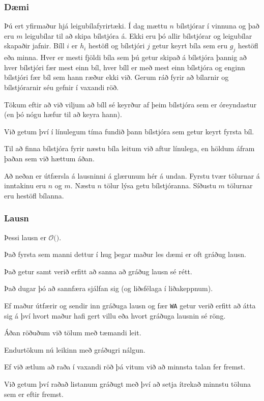 {
	\frametitle{Dæmi}
	{
		\item<1-> 
			Þú ert yfirmaður hjá leigubílafyrirtæki.
			Í dag mættu $n$ bílstjórar í vinnuna og það eru $m$ leigubílar til að skipa bílstjóra á.
			Ekki eru þó allir bílstjórar og leigubílar skapaðir jafnir.
			Bíll $i$ er $h_i$ hestöfl og bílstjóri $j$ getur keyrt bíla sem eru $g_j$ hestöfl eða minna.
			Hver er mesti fjöldi bíla sem þú getur skipað á bílstjóra
				þannig að hver bílstjóri fær mest einn bíl,
				hver bíll er með mest einn bílstjóra og
				enginn bílstjóri fær bíl sem hann ræður ekki við.
			Gerum ráð fyrir að bílarnir og bílstjórarnir séu gefnir í vaxandi röð.
		\item<2-> Tökum eftir að við viljum að bíll sé keyrður af þeim bílstjóra sem er óreyndastur (en þó nógu hæfur til að keyra hann).
		\item<3-> Við getum því í línulegum tíma fundið þann bílstjóra sem getur keyrt fyrsta bíl.
		\item<4-> Til að finna bílstjóra fyrir næstu bíla leitum við aftur línulega, en höldum áfram þaðan sem við hættum áðan.
	}
}

{
	Að neðan er útfærsla á lausninni á glærunum hér á undan. Fyrstu tvær tölurnar á inntakinu eru $n$ og $m$. 
		Næstu $n$ tölur lýsa getu bílstjóranna.
		Síðustu $m$ tölurnar eru hestöfl bílanna.
}

{
	\frametitle{Lausn}
	{
		\item<1-> Þessi lausn er $\mathcal{O}($\onslide<2->{$n + m$}$)$.
	}
}

{
	{
		\item<1-> Það fyrsta sem manni dettur í hug þegar maður les dæmi er oft gráðug lausn.
		\item<2-> Það getur samt verið erfitt að sanna að gráðug lausn sé rétt.
		\item<3-> Það dugar þó að sannfæra sjálfan sig (og liðsfélaga í liðakeppnum).
		\item<4-> Ef maður útfærir og sendir inn gráðuga lausn og fær \texttt{WA}
					getur verið erfitt að átta sig á því hvort maður hafi gert villu eða hvort gráðuga lausnin sé röng.
	}
}

{
	{
		\item<1-> Áðan röðuðum við tölum með tæmandi leit.
		\item<2-> Endurtökum nú leikinn með gráðugri nálgun.
		\item<3-> Ef við ætlum að raða í vaxandi röð þá vitum við að minnsta talan fer fremst.
		\item<4-> Við getum því raðað listanum gráðugt með því að setja ítrekað minnstu töluna sem er eftir fremst.
	}
}

